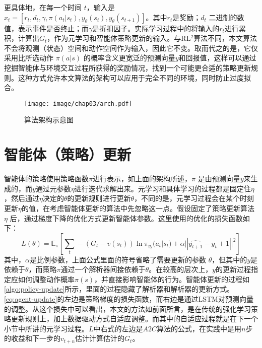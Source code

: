 更具体地，在每一个时间 $t$，输入是 $x_t = [r_t, d_t, \gamma, \pi(a_t | s_t), y_{\theta}(s_t), y_{\theta}(s_{t+1})]$。其中$r_t$是奖励；$d_t$ 二进制的数值，表示事件是否终止；而$\gamma$是折扣因子。实际学习过程中的将输入的$r_t$进行累积，计算出$G_t$，作为元学习和智能体策略更新的输入。与RL$^2$\cite{duanRLFastReinforcement2016}算法不同，本文算法不会将观测（状态）空间和动作空间作为输入，因此它不变。取而代之的是，它仅采用比所选动作 $\pi(a|s)$ 的概率含义更宽泛的预测向量$y$和回报值，这样可以通过挖掘智能体与环境交互过程所获得的奖励情况，找到一个可能更合适的策略更新规则。这种方式允许本文算法的架构可以应用于完全不同的环境，同时防止过度拟合。

\begin{figure}[h!]
    \centering
    \texttt{[image: image/chap03/arch.pdf]}
    \caption{算法架构示意图}
    \label{fig:arch}
\end{figure}



\section{智能体（策略）更新}
智能体的策略使用策略函数$\pi$进行表示，如上面的架构所述，$\pi$ 是由预测向量$y$来生成的，而$y$通过元参数$\eta$进行迭代求解出来。元学习和具体学习的过程都是固定住$\eta$，然后通过$\eta$决定的$\theta$的更新规则进行更新$\theta$，不同的是，元学习过程会在某个时刻更新$\eta$的值，在考虑智能体更新的算法中先忽略这一点。假设固定了策略更新算法 $\eta$ 后，通过梯度下降的优化方式更新智能体参数。这里使用的优化的损失函数如下：
\begin{equation}
    L(\theta) = \mathbb{E}_{\pi} \left[\sum_t -(G_t - v(s_t) ) \ln \pi_{y_t} (a_t|s_t) + \alpha ||\hat{y_{t+1}} - y_t+1||^2 \right]
    \label{eq:agent-update}
\end{equation}
其中，$\alpha$是比例参数，上面公式里面的符号省略了需要更新的参数 $\theta$，但其中的$y$是依赖于$\theta$，而策略$\pi$通过一个解析器间接依赖于$\theta$。在较高的层次上，$y$的更新过程指定应如何调整动作概率$\pi(s)$，并直接影响智能体的行为。智能体更新的过程如 \autoref{algo:policy-update}所示，里面的过程隐藏了解析器和解析器的更新方式。\autoref{eq:agent-update}的左边是策略梯度的损失函数，而右边是通过LSTM对预测向量的调整。从这个损失中可以看出，本文的方法如前面所言，是在传统的强化学习策略更新规则上，加上数据驱动方式自适应调整。而其中的自适应过程就是在下一个小节中所讲的元学习过程。$L$中右式的左边是$A2C$算法的公式，在实践中是用$n$步的收益和下一步的$v_{t+n}$估计计算估计的$G_t$。


